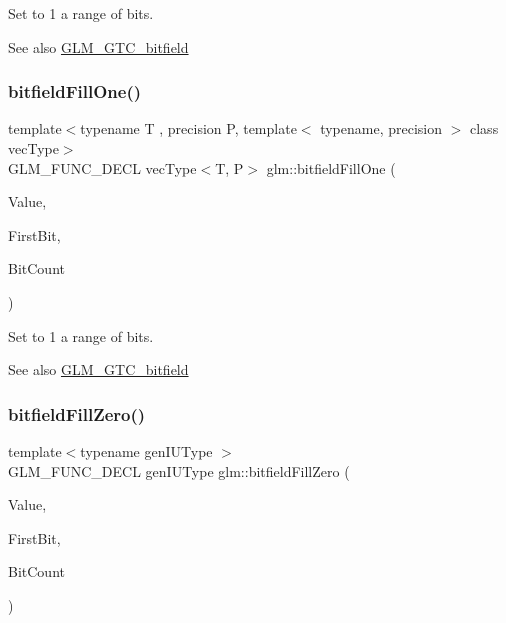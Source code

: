 Set to 1 a range of bits.

\begin{DoxySeeAlso}{See also}
\hyperlink{group__gtc__bitfield}{G\+L\+M\+\_\+\+G\+T\+C\+\_\+bitfield} 
\end{DoxySeeAlso}
\mbox{\label{group__gtc__bitfield_gad789042e84e8292ae95dc1af856f2ad5}} 
\subsubsection{\texorpdfstring{bitfield\+Fill\+One()}{bitfieldFillOne()}\hspace{0.1cm}{\footnotesize\ttfamily [2/2]}}
{\footnotesize\ttfamily template$<$typename T , precision P, template$<$ typename, precision $>$ class vec\+Type$>$ \\
G\+L\+M\+\_\+\+F\+U\+N\+C\+\_\+\+D\+E\+CL vec\+Type$<$T, P$>$ glm\+::bitfield\+Fill\+One (\begin{DoxyParamCaption}\item[{vec\+Type$<$ T, P $>$ const \&}]{Value,  }\item[{int}]{First\+Bit,  }\item[{int}]{Bit\+Count }\end{DoxyParamCaption})}

Set to 1 a range of bits.

\begin{DoxySeeAlso}{See also}
\hyperlink{group__gtc__bitfield}{G\+L\+M\+\_\+\+G\+T\+C\+\_\+bitfield} 
\end{DoxySeeAlso}
\mbox{\label{group__gtc__bitfield_ga697b86998b7d74ee0a69d8e9f8819fee}} 
\subsubsection{\texorpdfstring{bitfield\+Fill\+Zero()}{bitfieldFillZero()}\hspace{0.1cm}{\footnotesize\ttfamily [1/2]}}
{\footnotesize\ttfamily template$<$typename gen\+I\+U\+Type $>$ \\
G\+L\+M\+\_\+\+F\+U\+N\+C\+\_\+\+D\+E\+CL gen\+I\+U\+Type glm\+::bitfield\+Fill\+Zero (\begin{DoxyParamCaption}\item[{gen\+I\+U\+Type}]{Value,  }\item[{int}]{First\+Bit,  }\item[{int}]{Bit\+Count }\end{DoxyParamCaption})}

